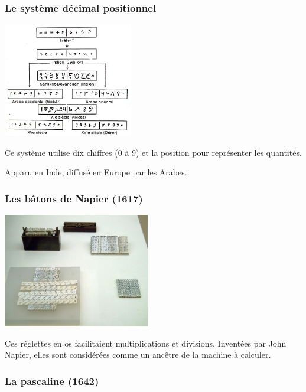 \documentclass[11pt]{article}
\begin{document}
\subsubsection{Le système décimal positionnel}
\label{sec:orgddd19e7}

\begin{center}
\includegraphics[width=0.8\linewidth, height=5cm, keepaspectratio]{./images/Numeration.png}
\end{center}

Ce système utilise dix chiffres (0 à 9) et la position pour
représenter les quantités.

Apparu en Inde, diffusé en Europe par les Arabes.



\subsubsection{Les bâtons de Napier (1617)}
\label{sec:org2563c03}

\begin{center}
\includegraphics[width=0.8\linewidth, height=5cm, keepaspectratio]{./images/batons-napier.jpg}
\end{center}

Ces réglettes en os facilitaient multiplications et
divisions. Inventées par John Napier, elles sont considérées comme un
ancêtre de la machine à calculer.




\subsubsection{La pascaline (1642)}
\label{sec:orga810454}
\end{document}
